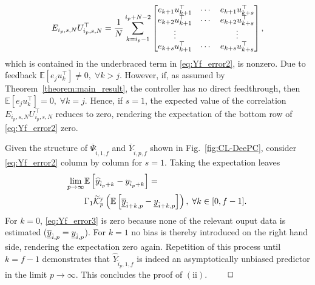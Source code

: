 \begin{align}
E_{i_p,s,N}U_{i_p,s,N}^\top =
    \frac{1}{N}\sum\limits_{k=i_p-1}^{i_p+N-2}
    \begin{bmatrix}
        e_{k+1} u_{k+1}^\top & \cdots & e_{k+1} u_{k+s}^\top\\
        e_{k+2} u_{k+1}^\top & \cdots & e_{k+2} u_{k+s}^\top\\
        \vdots &  & \vdots\\
        e_{k+s}u_{k+1}^\top & \cdots & e_{k+s}u_{k+s}^\top
    \end{bmatrix},\notag%
\end{align}
which is contained in the underbraced term in \eqref{eq:Yf_error2}, is nonzero. Due to feedback $\mathbb{E}[e_j u_k^\top]\neq 0,\;\forall k>j$. However, if, as assumed by Theorem~\ref{theorem:main_result}, the controller has no direct feedthrough, then $\mathbb{E}[e_j u_k^\top]= 0,\;\forall k=j$. Hence, if $s=1$, the expected value of the correlation $E_{i_p,s,N}U_{i_p,s,N}^\top$ reduces to zero, rendering the expectation of the bottom row of \eqref{eq:Yf_error2} zero.

Given the structure of $\overline{\Psi}_{\hat{i},1,f}$ and $\overline{Y}_{\hat{i},p,f}$ shown in Fig.~\ref{fig:CL-DeePC}, consider \eqref{eq:Yf_error2} column by column for $s=1$. Taking the expectation leaves
\begin{align}%
\begin{split}
    \mkern-3mu\lim_{p\rightarrow\infty} &\mathbb{E}\left[\widehat{y}_{\hat{i}_p+k}-y_{\hat{i}_p+k}\right] = \\ &\Gamma_1\tKp{y}\left(\mathbb{E}\left[\datavec{\overline{y}}{\hat{i}+k,p}-\datavec{y}{\hat{i}+k,p}\right]\right),\;\forall k\in[0,f-1].
\end{split}
\end{align}
For $k=0$, \eqref{eq:Yf_error3} is zero because none of the relevant ouput data is estimated ($\underline{\overline{y}}_{\hat{i},p}=\underline{y}_{\hat{i},p}$). For $k=1$ no bias is thereby introduced on the right hand side, rendering the expectation zero again. Repetition of this process until $k=f-1$ demonstrates that $\widehat{Y}_{\hat{i}_p,1,f}$ is indeed an asymptotically unbiased predictor in the limit $p\rightarrow\infty$. This concludes the proof of $\mathrm{(ii)}$. $\hfill\qed$

